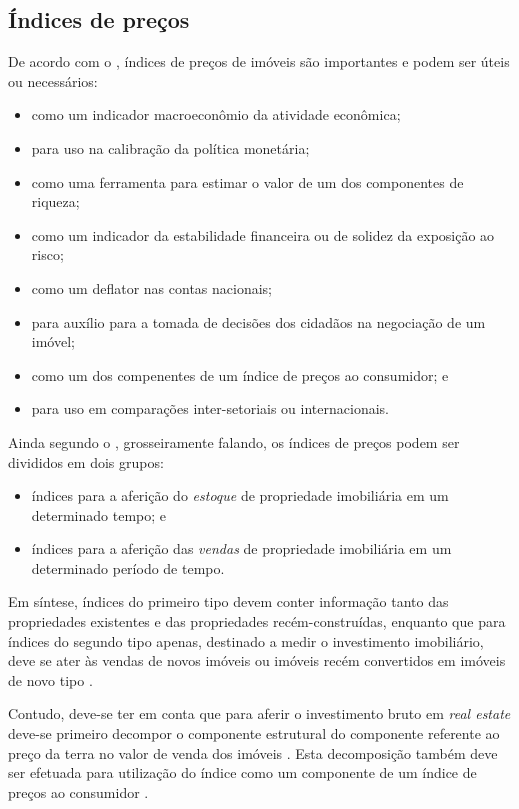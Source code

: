 \documentclass[
	12pt,				%
	oneside,			%
	a4paper,			%
	chapter=TITLE,		%
	section=TITLE,		%
	english,			%
	brazil				%
	]{abntex2}
\begin{document}
\subsection{Índices de preços}\label{uxedndices-de-preuxe7os}

De acordo com o \textcite{rppi}, índices de preços de imóveis são
importantes e podem ser úteis ou necessários:
\begin{itemize}
\tightlist
\item
  como um indicador macroeconômio da atividade econômica;
\item
  para uso na calibração da política monetária;
\item
  como uma ferramenta para estimar o valor de um dos componentes de
  riqueza;
\item
  como um indicador da estabilidade financeira ou de solidez da
  exposição ao risco;
\item
  como um deflator nas contas nacionais;
\item
  para auxílio para a tomada de decisões dos cidadãos na negociação de
  um imóvel;
\item
  como um dos compenentes de um índice de preços ao consumidor; e
\item
  para uso em comparações inter-setoriais ou internacionais.
\end{itemize}
Ainda segundo o \textcite{rppi}, grosseiramente falando, os índices de
preços podem ser divididos em dois grupos:
\begin{itemize}
\tightlist
\item
  índices para a aferição do \emph{estoque} de propriedade imobiliária
  em um determinado tempo; e
\item
  índices para a aferição das \emph{vendas} de propriedade imobiliária
  em um determinado período de tempo.
\end{itemize}
Em síntese, índices do primeiro tipo devem conter informação tanto das
propriedades existentes e das propriedades recém-construídas, enquanto
que para índices do segundo tipo apenas, destinado a medir o
investimento imobiliário, deve se ater às vendas de novos imóveis ou
imóveis recém convertidos em imóveis de novo tipo \autocite[155]{rppi}.

Contudo, deve-se ter em conta que para aferir o investimento bruto em
\emph{real estate} deve-se primeiro decompor o componente estrutural do
componente referente ao preço da terra no valor de venda dos imóveis
\autocite[155]{rppi}. Esta decomposição também deve ser efetuada para
utilização do índice como um componente de um índice de preços ao
consumidor \autocite[156]{rppi}.
\end{document}
